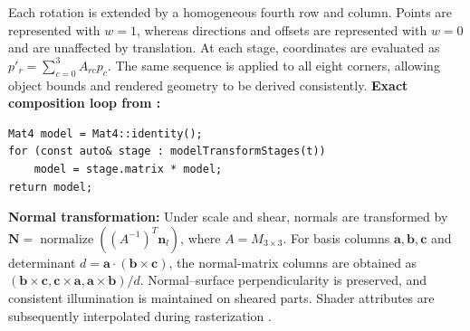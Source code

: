 Each rotation is extended by a homogeneous fourth row and column. Points are represented with $w=1$, whereas directions and offsets are represented with $w=0$ and are unaffected by translation. At each stage, coordinates are evaluated as $p'_r=\sum_{c=0}^{3}A_{rc}p_c$. The same sequence is applied to all eight corners, allowing object bounds and rendered geometry to be derived consistently.
\textbf{Exact composition loop from :}
\begin{verbatim}
Mat4 model = Mat4::identity();
for (const auto& stage : modelTransformStages(t))
    model = stage.matrix * model;
return model;
\end{verbatim}
\textbf{Normal transformation:} Under scale and shear, normals are transformed by $\mathbf N=\operatorname{normalize}((A^{-1})^T\mathbf n_l)$, where $A=M_{3\times3}$. For basis columns $\mathbf a,\mathbf b,\mathbf c$ and determinant $d=\mathbf a\cdot(\mathbf b\times\mathbf c)$, the normal-matrix columns are obtained as $(\mathbf b\times\mathbf c,\mathbf c\times\mathbf a,\mathbf a\times\mathbf b)/d$. Normal--surface perpendicularity is preserved, and consistent illumination is maintained on sheared parts. Shader attributes are subsequently interpolated during rasterization \cite{opengl}.
